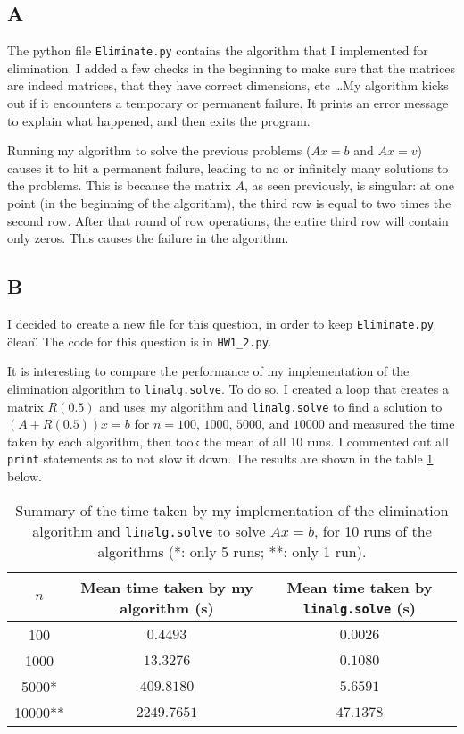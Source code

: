 \documentclass[]{article}
\begin{document}
\subsection*{A}
The python file \texttt{Eliminate.py} contains the algorithm that I implemented for elimination. I added a few checks in the beginning to make sure that the matrices are indeed matrices, that they have correct dimensions, etc \ldots My algorithm kicks out if it encounters a temporary or permanent failure. It prints an error message to explain what happened, and then exits the program.

Running my algorithm to solve the previous problems ($Ax = b$ and $Ax = v$) causes it to hit a permanent failure, leading to no or infinitely many solutions to the problems. This is because the matrix $A$, as seen previously, is singular: at one point (in the beginning of the algorithm), the third row is equal to two times the second row. After that round of row operations, the entire third row will contain only zeros. This causes the failure in the algorithm.

\subsection*{B}
I decided to create a new file for this question, in order to keep \texttt{Eliminate.py} \"clean\". The code for this question is in \texttt{HW1\_2.py}. 

It is interesting to compare the performance of my implementation of the elimination algorithm to \texttt{linalg.solve}. To do so, I created a loop that creates a matrix $R(0.5)$ and uses my algorithm and \texttt{linalg.solve} to find a solution to $(A+R(0.5))x = b$ for $n = 100\text{, } 1000\text{, } 5000\text{, and } 10000$ and measured the time taken by each algorithm, then took the mean of all 10 runs. I commented out all \texttt{print} statements as to not slow it down. The results are shown in the table \ref{times} below.
 
\begin{table}[h!]
\centering
\begin{tabular}{|c|c|c|} 
 \hline
 $n$ & Mean time taken by my algorithm (s) & Mean time taken by \texttt{linalg.solve} (s)\\ 
 \hline
 100 & $0.4493$ & $0.0026$ \\ 
 1000 & $13.3276$ & $0.1080$ \\
 5000* & $409.8180$ & $5.6591$ \\
 10000** & $2249.7651$ & $47.1378$ \\ 
 \hline
\end{tabular}
\caption{Summary of the time taken by my implementation of the elimination algorithm and \texttt{linalg.solve} to solve $Ax = b$, for 10 runs of the algorithms (*: only 5 runs; **: only 1 run).}
\label{times}
\end{table}
\end{document}
